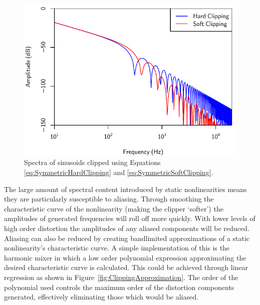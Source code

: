 			\begin{figure}[h!]
				\centering
				\includegraphics{chapter5/Images/ClippingSpectra.pdf}
				\caption{Spectra of sinusoids clipped using Equations \ref{eq:SymmetricHardClipping} and
			                 \ref{eq:SymmetricSoftClipping}.}
				\label{fig:ClippingSpectra}
			\end{figure}

			The large amount of spectral content introduced by static nonlinearities means they are
			particularly susceptible to aliasing. Through smoothing the characteristic curve of the
			nonlinearity (making the clipper `softer') the amplitudes of generated frequencies will roll off
			more quickly. With lower levels of high order distortion the amplitudes of any aliased components
			will be reduced. Aliasing can also be reduced by creating bandlimited approximations of a static
			nonlinearity's characteristic curve. A simple implementation of this is the harmonic mixer
			\citep{schattschneider1999discrete} in which a low order polynomial expression approximating the
			desired characteristic curve is calculated.  This could be achieved through linear regression as
			shown in Figure~\ref{fig:ClippingApproximation}. The order of the polynomial used controls the
			maximum order of the distortion components generated, effectively eliminating those which would be
			aliased.

